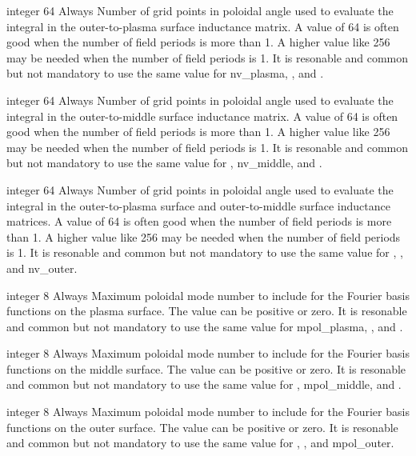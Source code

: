 \myhrule

{integer}
{64}
{Always}
{Number of grid points in poloidal angle used to evaluate the integral  in the outer-to-plasma surface inductance matrix.
A value of 64 is often good when the number of field periods is more than 1. A higher value like 256 may be needed when the number of field periods is 1.
It is resonable and common but not mandatory to use the same value for nv\_plasma, , and .}

\myhrule

{integer}
{64}
{Always}
{Number of grid points in poloidal angle used to evaluate the integral  in the outer-to-middle surface inductance matrix.
A value of 64 is often good when the number of field periods is more than 1. A higher value like 256 may be needed when the number of field periods is 1.
It is resonable and common but not mandatory to use the same value for , nv\_middle, and .}

\myhrule

{integer}
{64}
{Always}
{Number of grid points in poloidal angle used to evaluate the integral  in the outer-to-plasma surface and outer-to-middle surface inductance matrices.
A value of 64 is often good when the number of field periods is more than 1. A higher value like 256 may be needed when the number of field periods is 1.
It is resonable and common but not mandatory to use the same value for , , and nv\_outer.}

\myhrule

{integer}
{8}
{Always}
{Maximum poloidal mode number to include for the Fourier basis functions on the plasma surface. The value can be positive or zero.
It is resonable and common but not mandatory to use the same value for {\ttfamily mpol\_plasma}, , and .}

\myhrule

{integer}
{8}
{Always}
{Maximum poloidal mode number to include for the Fourier basis functions on the middle surface. The value can be positive or zero.
It is resonable and common but not mandatory to use the same value for , {\ttfamily mpol\_middle}, and .}

\myhrule

{integer}
{8}
{Always}
{Maximum poloidal mode number to include for the Fourier basis functions on the outer surface. The value can be positive or zero.
It is resonable and common but not mandatory to use the same value for , , and {\ttfamily mpol\_outer}.}

